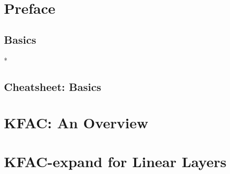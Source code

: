 \documentclass{article}
\begin{document}

\onecolumn


\clearpage


\clearpage

\setcounter{tocdepth}{2}
\tableofcontents
\clearpage

\section{Preface}\label{sec:preface}

\clearpage

\begin{paracol}{2}
  \section{Basics}\label{sec:basics}
  
  \switchcolumn[0]*
\end{paracol}
\clearpage

\begin{paracol}{1}
  \section{Cheatsheet: Basics}\label{sec:cheatsheet-basics}
  
\end{paracol}
\clearpage

\begin{paracol}{2}
  \section{KFAC: An Overview}\label{sec:kfac-overview}
  
  \clearpage

  \section{KFAC-expand for Linear Layers}\label{sec:kfac-expand-linear}
  




\end{paracol}
\clearpage
\end{document}
